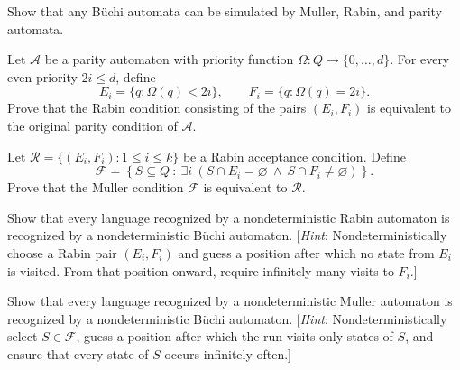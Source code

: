\documentclass[11pt,a4paper]{tutorial}
\begin{document}
\begin{exercise}
Show that any Büchi automata can be simulated by Muller, Rabin, and parity automata.
\end{exercise}

\begin{exercise}
Let $\mathcal A$ be a parity automaton with priority function
{\({\Omega:Q\to\{0,\ldots,d\}}\).}
For every even priority $2i\le d$, define
\[
E_i=\{q:\Omega(q)<2i\},
\qquad
F_i=\{q:\Omega(q)=2i\}.
\]
Prove that the Rabin condition consisting of the pairs
$(E_i,F_i)$ is equivalent to the original parity condition of $\mathcal A$.
\end{exercise}

\begin{exercise}
Let \(\mathcal R=\{(E_i,F_i):1\le i\le k\}\)
be a Rabin acceptance condition. Define
\[
\mathcal F=
\left\{
S\subseteq Q \ : \ \exists i\ (S\cap E_i=\varnothing \ \land\ S\cap F_i\neq\varnothing)
\right\}.
\]
Prove that the Muller condition $\mathcal F$ is equivalent to
$\mathcal R$.
\end{exercise}

\begin{exercise}
Show that every language recognized by a nondeterministic Rabin
automaton is recognized by a nondeterministic Büchi automaton.
[\textit{Hint}:
Nondeterministically choose a Rabin pair $(E_i,F_i)$ and guess
a position after which no state from $E_i$ is visited. From that
position onward, require infinitely many visits to $F_i$.]
\end{exercise}

\begin{exercise}
Show that every language recognized by a nondeterministic Muller
automaton is recognized by a nondeterministic Büchi automaton.
[\textit{Hint}:
Nondeterministically select $S\in\mathcal F$, guess a position
after which the run visits only states of $S$, and ensure that
every state of $S$ occurs infinitely often.]
\end{exercise}
\end{document}
